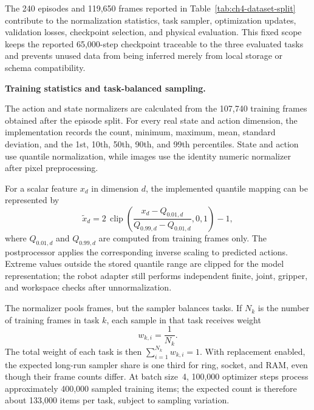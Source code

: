 The 240 episodes and 119,650 frames reported in
Table~\ref{tab:ch4-dataset-split} contribute to the normalization statistics,
task sampler, optimization updates, validation losses, checkpoint selection,
and physical evaluation. This fixed scope keeps the reported 65,000-step
checkpoint traceable to the three evaluated tasks and prevents unused data from
being inferred merely from local storage or schema compatibility.

\medskip
\noindent\textbf{Training statistics and task-balanced sampling.}

The action and state normalizers are calculated from the 107,740 training
frames obtained after the episode split. For every real state and action
dimension, the implementation records the count, minimum, maximum, mean,
standard deviation, and the 1st, 10th, 50th, 90th, and 99th percentiles. State
and action use quantile normalization, while images use the identity numeric
normalizer after pixel preprocessing.

For a scalar feature \(x_d\) in dimension \(d\), the implemented quantile
mapping can be represented by
\begin{equation}
  \widetilde x_d
  =
  2\,
  \operatorname{clip}
  \left(
  \frac{x_d-Q_{0.01,d}}
       {Q_{0.99,d}-Q_{0.01,d}},
  0,1
  \right)
  -1,
  \label{eq:ch4-quantile-normalization}
\end{equation}
where \(Q_{0.01,d}\) and \(Q_{0.99,d}\) are computed from training frames only.
The postprocessor applies the corresponding inverse scaling to predicted
actions. Extreme values outside the stored quantile range are clipped for the
model representation; the robot adapter still performs independent finite,
joint, gripper, and workspace checks after unnormalization.

The normalizer pools frames, but the sampler balances tasks. If
\(N_k\) is the number of training frames in task \(k\), each sample in that
task receives weight
\begin{equation}
  w_{k,i}=\frac{1}{N_k}.
  \label{eq:ch4-balanced-sample-weight}
\end{equation}
The total weight of each task is then
\(\sum_{i=1}^{N_k} w_{k,i}=1\). With replacement enabled, the expected
long-run sampler share is one third for ring, socket, and RAM, even though
their frame counts differ. At batch size~4, 100,000 optimizer steps process
approximately 400,000 sampled training items; the expected count is therefore
about 133,000 items per task, subject to sampling variation.

